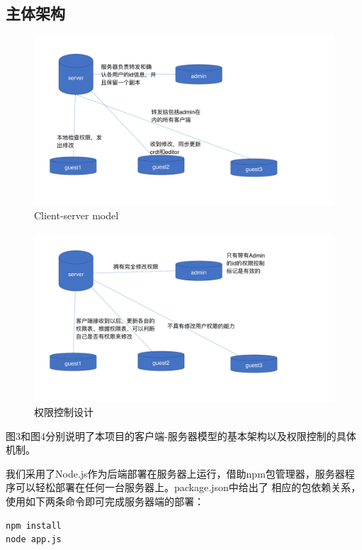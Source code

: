 \documentclass[11pt]{ctexart}
\begin{document}
\subsection{主体架构}
\begin{figure}[ht]
    \begin{center}
    \includegraphics[width=\textwidth]{figures/arch_1.pdf}
    \caption{Client-server model}
    \end{center}
\end{figure}
\begin{figure}[ht]
    \begin{center}
    \includegraphics[width=\textwidth]{figures/arch_2.pdf}
    \caption{权限控制设计}
    \end{center}
\end{figure}
图3和图4分别说明了本项目的客户端-服务器模型的基本架构以及权限控制的具体机制。

我们采用了Node.js作为后端部署在服务器上运行，借助npm包管理器，服务器程序可以轻松部署在任何一台服务器上。\textsf{package.json}中给出了
相应的包依赖关系，使用如下两条命令即可完成服务器端的部署：
\begin{verbatim}
npm install
node app.js
\end{verbatim}
\end{document}
